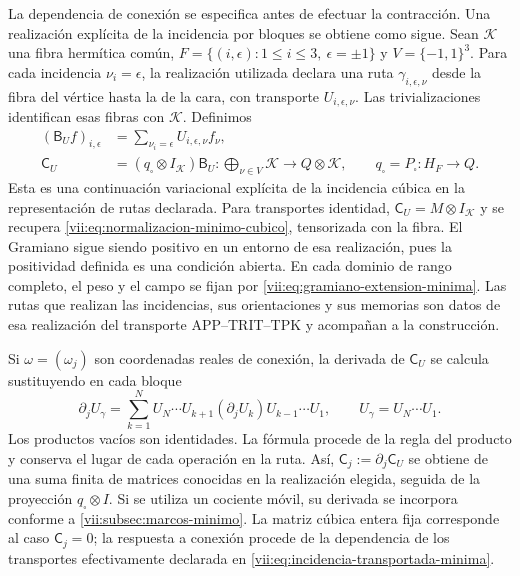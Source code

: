 La dependencia de conexión se especifica antes de efectuar la
contracción. Una realización explícita de la incidencia por bloques
se obtiene como sigue. Sean \(\mathcal K\) una fibra hermítica común,
\(F=\{(i,\epsilon):1\leq i\leq3,\ \epsilon=\pm1\}\) y
\(V=\{-1,1\}^3\). Para cada incidencia \(\nu_i=\epsilon\),
la realización utilizada declara una ruta \(\gamma_{i,\epsilon,\nu}\)
desde la fibra del vértice hasta la de la cara, con transporte
\(U_{i,\epsilon,\nu}\). Las trivializaciones identifican esas fibras
con \(\mathcal K\). Definimos
\begin{equation}
 \begin{split}
 (\mathsf B_Uf)_{i,\epsilon}
   &=\sum_{\nu_i=\epsilon}U_{i,\epsilon,\nu}f_\nu,\\
 \mathsf C_U&=(q_\square\otimes I_{\mathcal K})\mathsf B_U:
   \bigoplus_{\nu\in V}\mathcal K\longrightarrow Q\otimes\mathcal K,
 \qquad q_\square=P_\square:H_F\to Q.
 \end{split}
 \label{vii:eq:incidencia-transportada-minima}
\end{equation}
Esta es una continuación variacional explícita de la incidencia cúbica
en la representación de rutas declarada. Para transportes identidad,
\(\mathsf C_U=M\otimes I_{\mathcal K}\) y se recupera
\eqref{vii:eq:normalizacion-minimo-cubico}, tensorizada con la fibra.
El Gramiano sigue siendo positivo en un entorno de esa realización,
pues la positividad definida es una condición abierta. En cada dominio
de rango completo, el peso y el campo se fijan por
\eqref{vii:eq:gramiano-extension-minima}. Las rutas que realizan las
incidencias, sus orientaciones y sus memorias son datos de esa
realización del transporte APP--TRIT--TPK y acompañan a la construcción.

Si \(\omega=(\omega_j)\) son coordenadas reales de conexión,
la derivada de \(\mathsf C_U\) se calcula sustituyendo en cada bloque
\begin{equation}
 \partial_j U_\gamma
 =\sum_{k=1}^{N}
    U_N\cdots U_{k+1}(\partial_jU_k)U_{k-1}\cdots U_1,
 \qquad U_\gamma=U_N\cdots U_1.
 \label{vii:eq:derivada-incidencia-rutas}
\end{equation}
Los productos vacíos son identidades. La fórmula procede de la regla
del producto y conserva el lugar de cada operación en la ruta.
Así, \(\mathsf C_j:=\partial_j\mathsf C_U\) se obtiene de una
suma finita de matrices conocidas en la realización elegida, seguida
de la proyección \(q_\square\otimes I\). Si se utiliza un cociente
móvil, su derivada se incorpora conforme a
\ref{vii:subsec:marcos-minimo}. La matriz cúbica entera fija corresponde
al caso \(\mathsf C_j=0\); la respuesta a conexión procede de la
dependencia de los transportes efectivamente declarada en
\eqref{vii:eq:incidencia-transportada-minima}.

